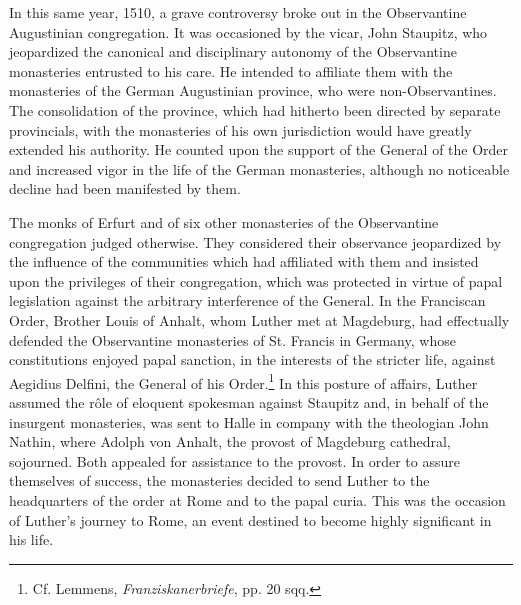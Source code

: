 In this same year, 1510, a grave controversy broke out in the
Observantine Augustinian congregation. It was occasioned by the
vicar, John Staupitz, who jeopardized the canonical and disciplinary
autonomy of the Observantine monasteries entrusted to his care. He
intended to affiliate them with the monasteries of the German Augustinian
province, who were non-Observantines. The consolidation of
the province, which had hitherto been directed by separate provincials,
with the monasteries of his own jurisdiction would have greatly
extended his authority. He counted upon the support of the General
of the Order and increased vigor in the life of the German
monasteries, although no noticeable decline had been manifested by
them.

The monks of Erfurt and of six other monasteries of the Observantine
congregation judged otherwise. They considered their observance
jeopardized by the influence of the communities which had affiliated
with them and insisted upon the privileges of their congregation,
which was protected in virtue of papal legislation against the arbitrary
interference of the General. In the Franciscan Order, Brother
Louis of Anhalt, whom Luther met at Magdeburg, had effectually
defended the Observantine monasteries of St. Francis in Germany,
whose constitutions enjoyed papal sanction, in the interests of the
stricter life, against Aegidius Delfini, the General of his Order.\footnote
{Cf. Lemmens, \textit{Franziskanerbriefe}, pp. 20 sqq.}
In this posture of affairs, Luther assumed the rôle of eloquent spokesman
against Staupitz and, in behalf of the insurgent monasteries,
was sent to Halle in company with the theologian John Nathin,
where Adolph von Anhalt, the provost of Magdeburg cathedral, sojourned.
Both appealed for assistance to the provost. In order to
assure themselves of success, the monasteries decided to send Luther
to the headquarters of the order at Rome and to the papal curia.
This was the occasion of Luther’s journey to Rome, an event destined
to become highly significant in his life.
